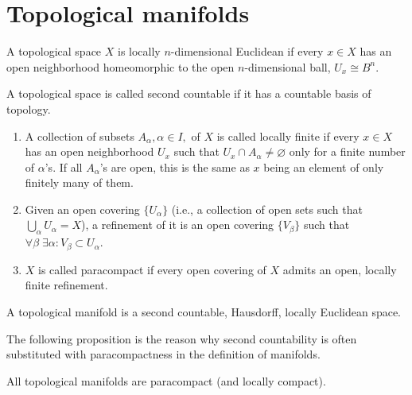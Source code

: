 \section{Topological manifolds}\label{sec topological manifolds}
\begin{defn}
    A topological space $X$ is locally $n$-dimensional Euclidean if every $x\in X$ has an open neighborhood homeomorphic to the open $n$-dimensional ball, $U_x\cong B^n$. 
\end{defn}
\begin{defn}
    A topological space is called second countable if it has a countable basis of topology.
\end{defn}
\begin{defn}[Paracompactness]
\begin{enumerate}
    \item A collection of subsets $A_\alpha, \alpha \in I,$ of $X$ is called locally finite if every $x\in X$ has an open neighborhood $U_x$ such that $U_x\cap A_\alpha \neq \varnothing$ only for a finite number of $\alpha$'s. If all $A_\alpha$'s are open, this is the same as $x$ being an element of only finitely many of them.
    \item Given an open covering $\{U_\alpha\}$ (i.e., a collection of open sets such that $\bigcup_\alpha U_\alpha=X$), a refinement of it is an open covering $\{V_\beta \}$ such that $\forall \beta \;\exists \alpha: V_\beta \subset U_\alpha $.
    \item $X$ is called paracompact if every open covering of $X$ admits an open, locally finite refinement.
\end{enumerate}
\end{defn}
\begin{defn}
    A topological manifold is a second countable, Hausdorff, locally Euclidean space.
\end{defn}
The following proposition is the reason why second countability is often substituted with paracompactness in the definition of manifolds.
\begin{prop}
    All topological manifolds are paracompact (and locally compact).
\end{prop}

